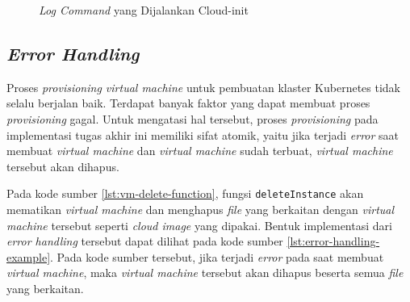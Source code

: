 \begin{figure}[H]
  \centering
  \caption{\emph{Log Command} yang Dijalankan Cloud-init}
  \label{fig:log-output-cloud-init}
\end{figure}

\subsection{\emph{Error Handling}}
\label{subsec:error-handling}

Proses \emph{provisioning virtual machine} untuk pembuatan
klaster Kubernetes tidak selalu berjalan baik. Terdapat banyak
faktor yang dapat membuat proses \emph{provisioning} gagal. Untuk
mengatasi hal tersebut, proses \emph{provisioning} pada implementasi
tugas akhir ini memiliki sifat atomik, yaitu jika terjadi \emph{error}
saat membuat \emph{virtual machine} dan \emph{virtual machine} sudah terbuat,
\emph{virtual machine} tersebut akan dihapus.



\clearpage



Pada kode sumber \ref{lst:vm-delete-function}, fungsi \lstinline{deleteInstance}
akan mematikan \emph{virtual machine} dan menghapus \emph{file} yang berkaitan
dengan \emph{virtual machine} tersebut seperti \emph{cloud image} yang dipakai.
Bentuk implementasi dari \emph{error handling} tersebut dapat dilihat pada kode
sumber \ref{lst:error-handling-example}. Pada kode sumber tersebut, jika terjadi
\emph{error} pada saat membuat \emph{virtual machine}, maka \emph{virtual machine}
tersebut akan dihapus beserta semua \emph{file} yang berkaitan.

